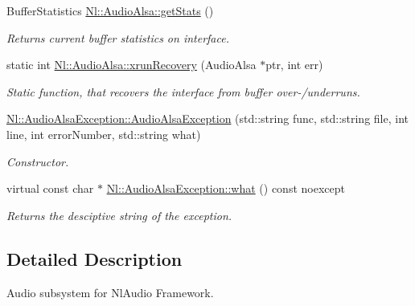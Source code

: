 \begin{DoxyCompactItemize}
Buffer\-Statistics \hyperlink{group__Audio_gad2391af4ccb27cc7e27a263a73d68a76}{Nl\-::\-Audio\-Alsa\-::get\-Stats} ()
\begin{DoxyCompactList}\small\item\em Returns current buffer statistics on interface. \end{DoxyCompactList}\item 
static int \hyperlink{group__Audio_ga3bfd0415c0694893adda600459e54d2e}{Nl\-::\-Audio\-Alsa\-::xrun\-Recovery} (Audio\-Alsa $\ast$ptr, int err)
\begin{DoxyCompactList}\small\item\em Static function, that recovers the interface from buffer over-\//underruns. \end{DoxyCompactList}\item 
\hyperlink{group__Audio_ga6c40dfc626db2587fc521cd9778fbc24}{Nl\-::\-Audio\-Alsa\-Exception\-::\-Audio\-Alsa\-Exception} (std\-::string func, std\-::string file, int line, int error\-Number, std\-::string what)
\begin{DoxyCompactList}\small\item\em Constructor. \end{DoxyCompactList}\item 
virtual const char $\ast$ \hyperlink{group__Audio_gae17c2bd37874966590d2866c9eddcdd7}{Nl\-::\-Audio\-Alsa\-Exception\-::what} () const noexcept
\begin{DoxyCompactList}\small\item\em Returns the desciptive string of the exception. \end{DoxyCompactList}\end{DoxyCompactItemize}


\subsection{Detailed Description}
Audio subsystem for Nl\-Audio Framework. 

